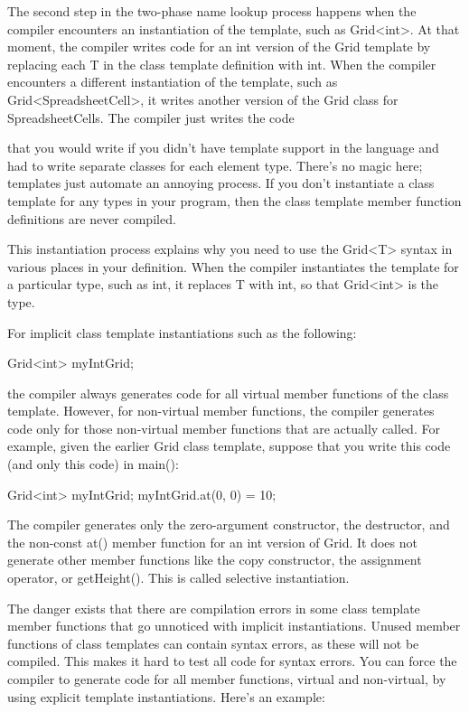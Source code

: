 The second step in the two-phase name lookup process happens when the compiler encounters an instantiation of the template, such as Grid<int>. At that moment, the compiler writes code for an int version of the Grid template by replacing each T in the class template definition with int. When the compiler encounters a different instantiation of the template, such as Grid<SpreadsheetCell>, it writes another version of the Grid class for SpreadsheetCells. The compiler just writes the code

that you would write if you didn’t have template support in the language and had to write separate classes for each element type. There’s no magic here; templates just automate an annoying process. If you don’t instantiate a class template for any types in your program, then the class template member function definitions are never compiled.

This instantiation process explains why you need to use the Grid<T> syntax in various places in your definition. When the compiler instantiates the template for a particular type, such as int, it replaces T with int, so that Grid<int> is the type.


For implicit class template instantiations such as the following:

\begin{cpp}
Grid<int> myIntGrid;
\end{cpp}

the compiler always generates code for all virtual member functions of the class template. However, for non-virtual member functions, the compiler generates code only for those non-virtual member functions that are actually called. For example, given the earlier Grid class template, suppose that you write this code (and only this code) in main():

\begin{cpp}
Grid<int> myIntGrid;
myIntGrid.at(0, 0) = 10;
\end{cpp}

The compiler generates only the zero-argument constructor, the destructor, and the non-const at() member function for an int version of Grid. It does not generate other member functions like the copy constructor, the assignment operator, or getHeight(). This is called selective instantiation.



The danger exists that there are compilation errors in some class template member functions that go unnoticed with implicit instantiations. Unused member functions of class templates can contain syntax errors, as these will not be compiled. This makes it hard to test all code for syntax errors. You can force the compiler to generate code for all member functions, virtual and non-virtual, by using explicit template instantiations. Here’s an example:

